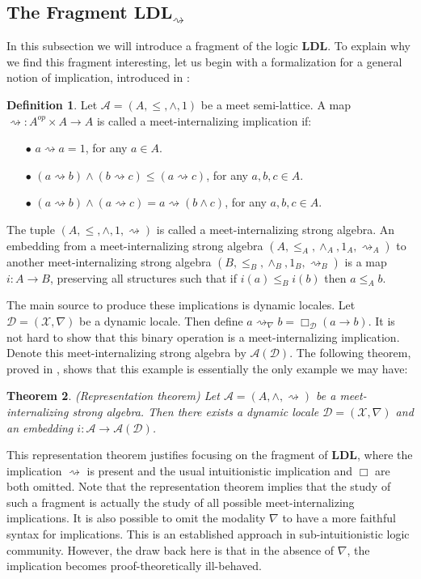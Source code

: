 \documentclass[12pt,a4paper]{article}
\theoremstyle{plain}
\newtheorem{thm}{Theorem}[section]
\theoremstyle{definition}
\newtheorem{dfn}[thm]{Definition}
\begin{document}
\subsection{The Fragment $\mathbf{LDL}_{\rightsquigarrow}$}
In this subsection we will introduce a fragment of the logic $\mathbf{LDL}$. To explain why we find this fragment interesting, let us begin with a formalization for a general notion of implication, introduced in \cite{Amir}:
\begin{dfn}
Let $\mathcal{A}=(A, \leq, \wedge, 1)$ be a meet semi-lattice. A map $\rightsquigarrow : A^{op} \times A \to A$ is called a meet-internalizing implication if:
\begin{itemize}
\item[$\bullet$]
$a \rightsquigarrow a=1$, for any $a \in A$.
\item[$\bullet$]
$(a \rightsquigarrow b) \wedge (b \rightsquigarrow c) \leq (a \rightsquigarrow c)$, for any $a, b, c \in A$.
\item[$\bullet$]
$(a \rightsquigarrow b) \wedge (a \rightsquigarrow c)= a \rightsquigarrow (b \wedge c)$, for any $a, b, c \in A$.
\end{itemize}
The tuple $(A, \leq, \wedge, 1, \rightsquigarrow)$ is called a meet-internalizing strong algebra. An embedding from a meet-internalizing strong algebra $(A, \leq_A, \wedge_A, 1_A, \rightsquigarrow_A)$ to another meet-internalizing strong algebra $(B, \leq_B, \wedge_B, 1_B, \rightsquigarrow_B)$ is a map $i : A \to B$, preserving all structures such that if $i(a) \leq_B i(b)$ then $a \leq_A b$.
\end{dfn}
The main source to produce these implications is dynamic locales. Let $\mathcal{D}=(\mathscr{X}, \nabla)$ be a dynamic locale. Then define $a \rightsquigarrow_{\nabla} b=\Box_{\mathcal{D}}(a \to b)$. It is not hard to show that this binary operation is a meet-internalizing implication. Denote this meet-internalizing strong algebra by $\mathcal{A}(\mathcal{D})$. The following theorem, proved in \cite{Amir}, shows that this example is essentially the only example we may have:
\begin{thm}(Representation theorem)
Let $\mathcal{A}=(A, \wedge, \rightsquigarrow)$ be a meet-internalizing strong algebra. Then there exists a dynamic locale $\mathcal{D}=(\mathscr{X}, \nabla)$ and an embedding $i: \mathcal{A} \to \mathcal{A}(\mathcal{D})$.
\end{thm}

This representation theorem justifies focusing on the fragment of $\mathbf{LDL}$, where the implication $\rightsquigarrow$ is present and the usual intuitionistic implication and $\Box$ are both omitted. Note that the representation theorem implies that the study of such a fragment is actually the study of all possible meet-internalizing implications. It is also possible to omit the modality $\nabla$ to have a more faithful syntax for implications. This is an established approach in sub-intuitionistic logic community. However, the draw back here is that in the absence of $\nabla$, the implication becomes proof-theoretically ill-behaved.\\
\end{document}
